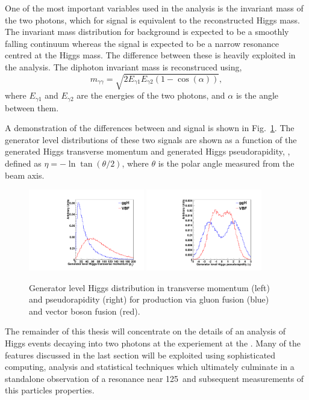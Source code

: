One of the most important variables used in the analysis is the invariant mass of the two photons, which for signal is equivalent to the reconstructed Higgs mass. The invariant mass distribution for background is expected to be a smoothly falling continuum whereas the signal is expected to be a narrow resonance centred at the Higgs mass. The difference between these is heavily exploited in the analysis. The diphoton invariant mass is reconstruced using,
\begin{equation}
	m_{\gamma\gamma} = \sqrt{2E_{\gamma1}E_{\gamma2}(1-\cos(\alpha))},
\label{eq:invmass}
\end{equation}
where $E_{\gamma1}$ and $E_{\gamma2}$ are the energies of the two photons, and $\alpha$ is the angle between them.

A demonstration of the differences between \ggH and \VBF signal is shown in Fig.~\ref{fig:gen_level}. The generator level distributions of these two signals are shown as a function of the generated Higgs transverse momentum and generated Higgs pseudorapidity, \eta, defined as $\eta=-\ln\tan(\theta/2)$, where $\theta$ is the polar angle measured from the beam axis. 
\begin{figure}
  \includegraphics[width=0.45\textwidth]{theory/plots/genPT.pdf}
  \includegraphics[width=0.45\textwidth]{theory/plots/genEta.pdf}
  \caption[Generator level Higgs distributions]{Generator level Higgs distribution in transverse momentum (left) and pseudorapidity (right) for production via gluon fusion (blue) and vector boson fusion (red).}
  \label{fig:gen_level}
\end{figure}

The remainder of this thesis will concentrate on the details of an analysis of Higgs events decaying into two photons at the \CMS experiement at the \LHC. Many of the features discussed in the last section will be exploited using sophisticated computing, analysis and statistical techniques which ultimately culminate in a standalone observation of a resonance near 125~\GeV and subsequent measurements of this particles properties.
